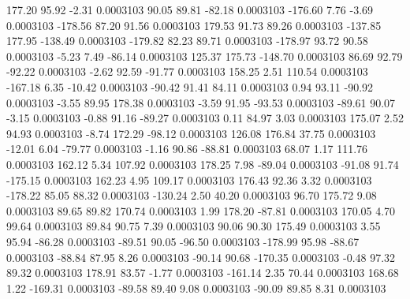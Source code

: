       177.20       95.92       -2.31     0.0003103
       90.05       89.81      -82.18     0.0003103
     -176.60        7.76       -3.69     0.0003103
     -178.56       87.20       91.56     0.0003103
      179.53       91.73       89.26     0.0003103
     -137.85      177.95     -138.49     0.0003103
     -179.82       82.23       89.71     0.0003103
     -178.97       93.72       90.58     0.0003103
       -5.23        7.49      -86.14     0.0003103
      125.37      175.73     -148.70     0.0003103
       86.69       92.79      -92.22     0.0003103
       -2.62       92.59      -91.77     0.0003103
      158.25        2.51      110.54     0.0003103
     -167.18        6.35      -10.42     0.0003103
      -90.42       91.41       84.11     0.0003103
        0.94       93.11      -90.92     0.0003103
       -3.55       89.95      178.38     0.0003103
       -3.59       91.95      -93.53     0.0003103
      -89.61       90.07       -3.15     0.0003103
       -0.88       91.16      -89.27     0.0003103
        0.11       84.97        3.03     0.0003103
      175.07        2.52       94.93     0.0003103
       -8.74      172.29      -98.12     0.0003103
      126.08      176.84       37.75     0.0003103
      -12.01        6.04      -79.77     0.0003103
       -1.16       90.86      -88.81     0.0003103
       68.07        1.17      111.76     0.0003103
      162.12        5.34      107.92     0.0003103
      178.25        7.98      -89.04     0.0003103
      -91.08       91.74     -175.15     0.0003103
      162.23        4.95      109.17     0.0003103
      176.43       92.36        3.32     0.0003103
     -178.22       85.05       88.32     0.0003103
     -130.24        2.50       40.20     0.0003103
       96.70      175.72        9.08     0.0003103
       89.65       89.82      170.74     0.0003103
        1.99      178.20      -87.81     0.0003103
      170.05        4.70       99.64     0.0003103
       89.84       90.75        7.39     0.0003103
       90.06       90.30      175.49     0.0003103
        3.55       95.94      -86.28     0.0003103
      -89.51       90.05      -96.50     0.0003103
     -178.99       95.98      -88.67     0.0003103
      -88.84       87.95        8.26     0.0003103
      -90.14       90.68     -170.35     0.0003103
       -0.48       97.32       89.32     0.0003103
      178.91       83.57       -1.77     0.0003103
     -161.14        2.35       70.44     0.0003103
      168.68        1.22     -169.31     0.0003103
      -89.58       89.40        9.08     0.0003103
      -90.09       89.85        8.31     0.0003103
